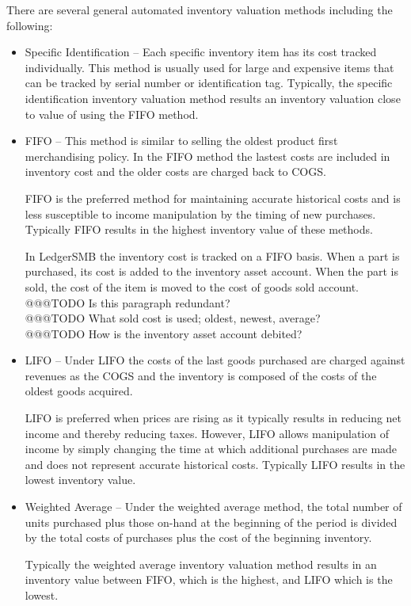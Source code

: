 There are several general automated inventory valuation methods including the following:
\begin{itemize}
	\item Specific Identification -- Each specific inventory item has its cost tracked individually. 
	This method is usually used for large and expensive items that can be tracked by 
	serial number or identification tag. 
	Typically, the specific identification inventory valuation method results an inventory valuation
	close to value of using the \gls{FIFO} method.
	\item \gls{FIFO} -- This method is similar to selling the oldest product first merchandising policy.
	In the \gls{FIFO} method the lastest costs are included in inventory cost and the older costs
	are charged back to \gls{COGS}.

	\gls{FIFO} is the preferred method for maintaining accurate historical costs and is less 
	susceptible to income manipulation by the timing of new purchases. Typically \gls{FIFO}
	results in the highest inventory value of these methods.
	
	In LedgerSMB the inventory cost is tracked on a \gls{FIFO} basis. When a part is purchased, 
	its cost is added to the inventory asset account. When the part is sold, the cost of the item
	is moved to the cost of goods sold account.\\
	@@@TODO Is this paragraph redundant?\\
	@@@TODO  What sold cost is used; oldest, newest, average?\\
	@@@TODO How is the inventory asset account debited?
	\item \gls{LIFO} --  Under \gls{LIFO} the costs of the last goods purchased are charged
	against revenues as the \gls{COGS} and the inventory is composed of the costs
	of the oldest goods acquired.
	
	\gls{LIFO} is preferred when prices are rising as it typically results in reducing net income and
	thereby reducing taxes. However, \gls{LIFO} allows manipulation of income by simply changing the time
	at which additional purchases are made and does not represent accurate historical costs. 
	Typically \gls{LIFO} results in the lowest inventory value.
	
	\item Weighted Average -- Under the weighted average method, the total number of units 
	purchased plus those on-hand at the beginning of the period is divided by the total costs
	of purchases plus the cost of the beginning inventory.
	
	Typically the weighted average inventory valuation method results in 
	an inventory value between \gls{FIFO}, which is the highest,
	and \gls{LIFO} which is the lowest.
\end{itemize}

 
